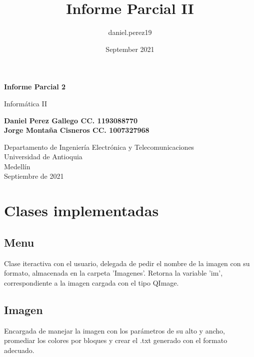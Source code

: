 \documentclass{article}
\title{Informe Parcial II}
\author{daniel.perez19 }
\date{September 2021}
\begin{document}
\begin{titlepage}
    \begin{center}
        \vspace*{1cm}
            
        \Huge
        \textbf{Informe Parcial 2}
            
        \vspace{0.5cm}
        \LARGE
        Informática II
            
        \vspace{1.5cm}
            
        \textbf{Daniel Perez Gallego CC. 1193088770\\Jorge Montaña Cisneros CC.  1007327968}
            
        \vfill
            
        \vspace{0.8cm}
            
        \Large
        Departamento de Ingeniería Electrónica y Telecomunicaciones\\
        Universidad de Antioquia\\
        Medellín\\
        Septiembre de 2021
            
    \end{center}
\end{titlepage}

\tableofcontents
\vspace{1,5cm}
\section{Clases implementadas}

\subsection{Menu}
Clase iteractiva con el usuario, delegada de pedir el nombre de la imagen con su formato, almacenada en la carpeta 'Imagenes'. Retorna la variable 'im', correspondiente a la imagen cargada con el tipo QImage.\\

\subsection{Imagen}
Encargada de manejar la imagen con los parámetros de su alto y ancho, promediar los colores por bloques y crear el .txt generado con el formato adecuado.\\
\end{document}
